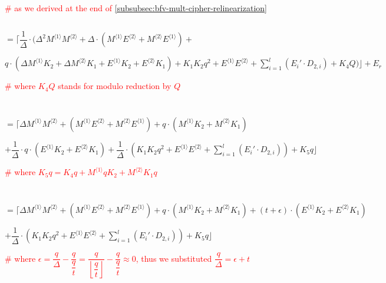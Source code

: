 \textcolor{red}{ \# as we derived at the end of \autoref{subsubsec:bfv-mult-cipher-relinearization}}

$ $

$ = \Bigg\lceil\dfrac{1}{\Delta}\cdot ( \Delta^2M^{\langle 1 \rangle}M^{\langle 2 \rangle} + \Delta\cdot (M^{\langle 1 \rangle}E^{\langle 2 \rangle} + M^{\langle 2 \rangle}E^{\langle 1 \rangle}) + $

\text{ } \text{ } $ q\cdot(\Delta M^{\langle 1 \rangle}K_2 + \Delta M^{\langle 2 \rangle}K_1 + E^{\langle 1 \rangle}K_2 + E^{\langle 2 \rangle}K_1) + K_1 K_2 q^2 + E^{\langle 1 \rangle} E^{\langle 2 \rangle} + \sum\limits_{i=1}^{l} (E_i'\cdot D_{2,i}) + K_4Q
)\Bigg\rfloor + E_r$

\textcolor{red}{ \# where $K_4Q$ stands for modulo reduction by $Q$}


$ $

$ $



$ = \Bigg\lceil\Delta M^{\langle 1 \rangle}M^{\langle 2 \rangle} + (M^{\langle 1 \rangle}E^{\langle 2 \rangle} + M^{\langle 2 \rangle}E^{\langle 1 \rangle}) + q\cdot (M^{\langle 1 \rangle}K_2 +  M^{\langle 2 \rangle}K_1) $

\text{ } \text{ } $+ \dfrac{1}{\Delta}\cdot q\cdot(E^{\langle 1 \rangle}K_2 + E^{\langle 2 \rangle}K_1) + \dfrac{1}{\Delta}\cdot (K_1K_2q^2 
 + E^{\langle 1 \rangle} E^{\langle 2 \rangle} + \sum\limits_{i=1}^{l} (E_i'\cdot D_{2,i})) + K_5q\Bigg\rfloor $ 

\text{ } \text{ }  \textcolor{red}{ \# where $K_5q = K_4q + M^{\langle 1 \rangle}q K_2 + M^{\langle 2 \rangle} K_1q$}




$ $

$ $

$ = \Bigg\lceil\Delta M^{\langle 1 \rangle}M^{\langle 2 \rangle} + (M^{\langle 1 \rangle}E^{\langle 2 \rangle} + M^{\langle 2 \rangle}E^{\langle 1 \rangle}) + q\cdot (M^{\langle 1 \rangle}K_2 +  M^{\langle 2 \rangle}K_1) + (t + \epsilon)\cdot(E^{\langle 1 \rangle}K_2 + E^{\langle 2 \rangle}K_1) $

\text{ } \text{ } $+  \dfrac{1}{\Delta}\cdot (K_1K_2q^2 
 + E^{\langle 1 \rangle} E^{\langle 2 \rangle} + \sum\limits_{i=1}^{l} (E_i'\cdot D_{2,i})) + K_5q\Bigg\rfloor $ 

\text{ } \text{ }  \textcolor{red}{ \# where $\epsilon = \dfrac{q}{\Delta} - \dfrac{q}{\dfrac{q}{t}} = \dfrac{q}{\left\lfloor\dfrac{q}{t}\right\rfloor} - \dfrac{q}{\dfrac{q}{t}} \approx 0$, thus we substituted $\dfrac{q}{\Delta} = \epsilon + t$}


